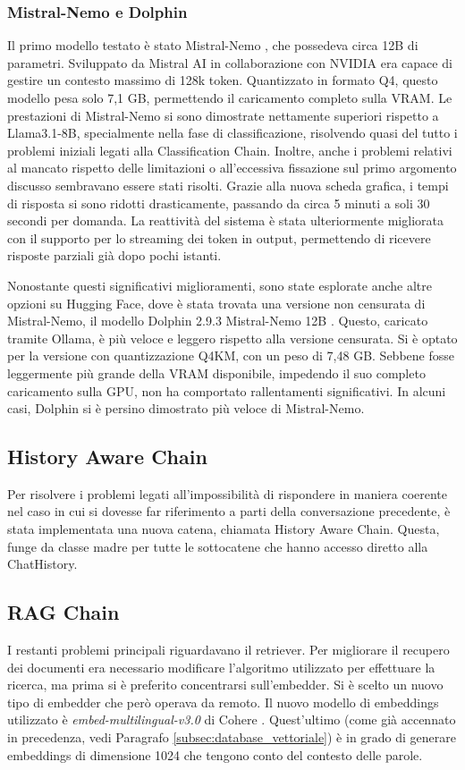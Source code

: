 \subsubsection{Mistral-Nemo e Dolphin}
Il primo modello testato è stato Mistral-Nemo \cite{mistralnemo12b}, che possedeva circa 12B di parametri. Sviluppato da Mistral AI in collaborazione con NVIDIA era capace di gestire un contesto massimo di 128k token. Quantizzato in formato Q4, questo modello pesa solo 7,1 GB, permettendo il caricamento completo sulla VRAM. Le prestazioni di Mistral-Nemo si sono dimostrate nettamente superiori rispetto a Llama3.1-8B, specialmente nella fase di classificazione, risolvendo quasi del tutto i problemi iniziali legati alla Classification Chain. Inoltre, anche i problemi relativi al mancato rispetto delle limitazioni o all'eccessiva fissazione sul primo argomento discusso sembravano essere stati risolti. Grazie alla nuova scheda grafica, i tempi di risposta si sono ridotti drasticamente, passando da circa 5 minuti a soli 30 secondi per domanda. La reattività del sistema è stata ulteriormente migliorata con il supporto per lo streaming dei token in output, permettendo di ricevere risposte parziali già dopo pochi istanti.

Nonostante questi significativi miglioramenti, sono state esplorate anche altre opzioni su Hugging Face, dove è stata trovata una versione non censurata di Mistral-Nemo, il modello Dolphin 2.9.3 Mistral-Nemo 12B \cite{dolphin}. Questo, caricato tramite Ollama, è più veloce e leggero rispetto alla versione censurata. Si è optato per la versione con quantizzazione Q4KM, con un peso di 7,48 GB. Sebbene fosse leggermente più grande della VRAM disponibile, impedendo il suo completo caricamento sulla GPU, non ha comportato rallentamenti significativi. In alcuni casi, Dolphin si è persino dimostrato più veloce di Mistral-Nemo.

\subsection{History Aware Chain}
Per risolvere i problemi legati all'impossibilità di rispondere in maniera coerente nel caso in cui si dovesse far riferimento a parti della conversazione precedente, è stata implementata una nuova catena, chiamata History Aware Chain. Questa, funge da classe madre per tutte le sottocatene che hanno accesso diretto alla ChatHistory.

\subsection{RAG Chain}
I restanti problemi principali riguardavano il retriever. Per migliorare il recupero dei documenti era necessario modificare l'algoritmo utilizzato per effettuare la ricerca, ma prima si è preferito concentrarsi sull'embedder. Si è scelto un nuovo tipo di embedder che però operava da remoto. Il nuovo modello di embeddings utilizzato è \textit{embed-multilingual-v3.0} di Cohere \cite{cohereembed}. Quest'ultimo (come già accennato in precedenza, vedi Paragrafo \ref{subsec:database_vettoriale}) è in grado di generare embeddings di dimensione 1024 che tengono conto del contesto delle parole.

